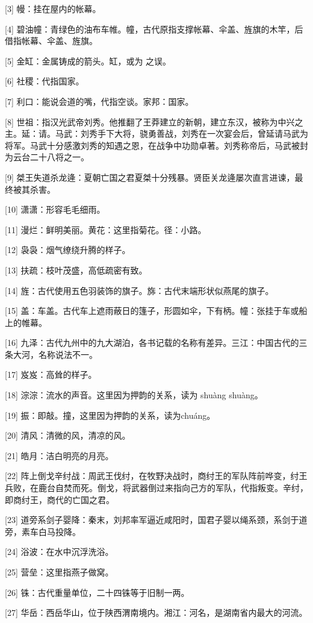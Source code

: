 \documentclass[12pt,UTF8]{ctexbook}
\begin{document}
[3] 幔：挂在屋内的帐幕。

[4] 碧油幢：青绿色的油布车帷。幢，古代原指支撑帐幕、伞盖、旌旗的木竿，后借指帐幕、伞盖、旌旗。

[5] 金缸：金属铸成的箭头。缸，或为 之误。

[6] 社稷：代指国家。

[7] 利口：能说会道的嘴，代指空谈。家邦：国家。

[8] 世祖：指汉光武帝刘秀。他推翻了王莽建立的新朝，建立东汉，被称为中兴之主。延：请。马武：刘秀手下大将，骁勇善战，刘秀在一次宴会后，曾延请马武为将军。马武十分感激刘秀的知遇之恩，在战争中功勋卓著。刘秀称帝后，马武被封为云台二十八将之一。

[9] 桀王失道杀龙逄：夏朝亡国之君夏桀十分残暴。贤臣关龙逄屡次直言进谏，最终被其杀害。

[10] 潇潇：形容毛毛细雨。

[11] 漫烂：鲜明美丽。黄花：这里指菊花。径：小路。

[12] 袅袅：烟气缭绕升腾的样子。

[13] 扶疏：枝叶茂盛，高低疏密有致。

[14] 旌：古代使用五色羽装饰的旗子。旆：古代末端形状似燕尾的旗子。

[15] 盖：车盖。古代车上遮雨蔽日的篷子，形圆如伞，下有柄。幢：张挂于车或船上的帷幕。

[16] 九泽：古代九州中的九大湖泊，各书记载的名称有差异。三江：中国古代的三条大河，名称说法不一。

[17] 岌岌：高耸的样子。

[18] 淙淙：流水的声音。这里因为押韵的关系，读为 shuàng shuàng。

[19] 振：即敲。撞，这里因为押韵的关系，读为chuáng。

[20] 清风：清微的风，清凉的风。

[21] 皓月：洁白明亮的月亮。

[22] 阵上倒戈辛纣战：周武王伐纣，在牧野决战时，商纣王的军队阵前哗变，纣王兵败，在鹿台自焚而死。倒戈，将武器倒过来指向己方的军队，代指叛变。辛纣，即商纣王，商代的亡国之君。

[23] 道旁系剑子婴降：秦末，刘邦率军逼近咸阳时，国君子婴以绳系颈，系剑于道旁，素车白马投降。

[24] 浴波：在水中沉浮洗浴。

[25] 营垒：这里指燕子做窝。

[26] 铢：古代重量单位，二十四铢等于旧制一两。

[27] 华岳：西岳华山，位于陕西渭南境内。湘江：河名，是湖南省内最大的河流。
\end{document}

